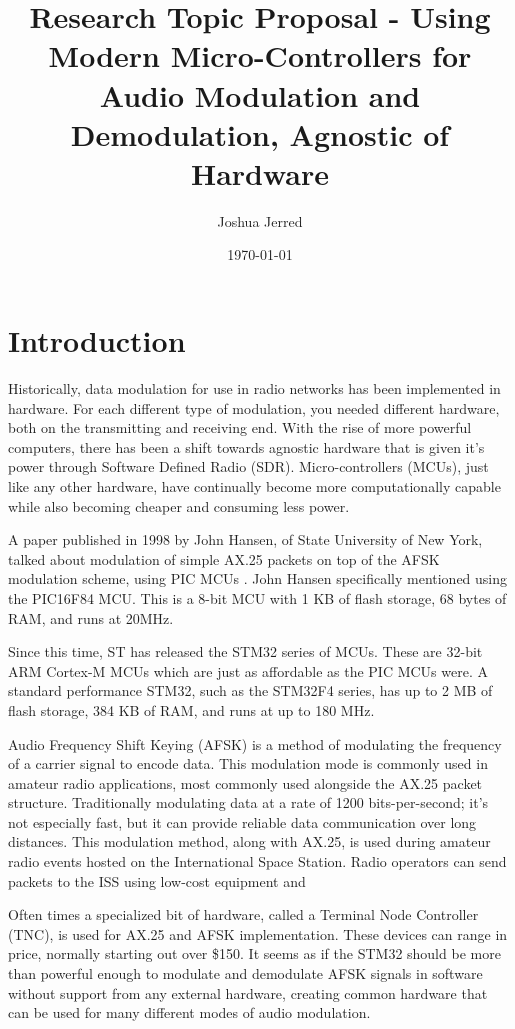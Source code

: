 \documentclass{article}[12pt,a4paper]
\title{Research Topic Proposal - Using Modern Micro-Controllers for Audio Modulation and Demodulation, Agnostic of Hardware}
\author{Joshua Jerred}
\date{\today}
\begin{document}
\maketitle

\section*{Introduction}

Historically, data modulation for use in radio networks has been implemented in hardware. For each different type of modulation, you needed different hardware, both on the transmitting and receiving end. With the rise of more powerful computers, there has been a shift towards agnostic hardware that is given it's power through Software Defined Radio (SDR). Micro-controllers (MCUs), just like any other hardware, have continually become more computationally capable while also becoming cheaper and consuming less power.

A paper published in 1998 by John Hansen, of State University of New York, talked about modulation of simple AX.25 packets on top of the AFSK modulation scheme, using PIC MCUs \cite{hansen_ax25}. John Hansen specifically mentioned using the PIC16F84 MCU. This is a 8-bit MCU with 1 KB of flash storage, 68 bytes of RAM, and runs at 20MHz\cite{pic_datasheet}.

Since this time, ST has released the STM32 series of MCUs. These are 32-bit ARM Cortex-M MCUs which are just as affordable as the PIC MCUs were. A standard performance STM32, such as the STM32F4 series, has up to 2 MB of flash storage, 384 KB of RAM, and runs at up to 180 MHz\cite{st_datasheet}.

Audio Frequency Shift Keying (AFSK) is a method of modulating the frequency of a carrier signal to encode data. This modulation mode is commonly used in amateur radio applications, most commonly used alongside the AX.25 packet structure. Traditionally modulating data at a rate of 1200 bits-per-second; it's not especially fast, but it can provide reliable data communication over long distances. This modulation method, along with AX.25, is used during amateur radio events hosted on the International Space Station. Radio operators can send packets to the ISS using low-cost equipment and 

Often times a specialized bit of hardware, called a Terminal Node Controller (TNC), is used for AX.25 and AFSK implementation. These devices can range in price, normally starting out over \$150. It seems as if the STM32 should be more than powerful enough to modulate and demodulate AFSK signals in software without support from any external hardware, creating common hardware that can be used for many different modes of audio modulation.
\end{document}
